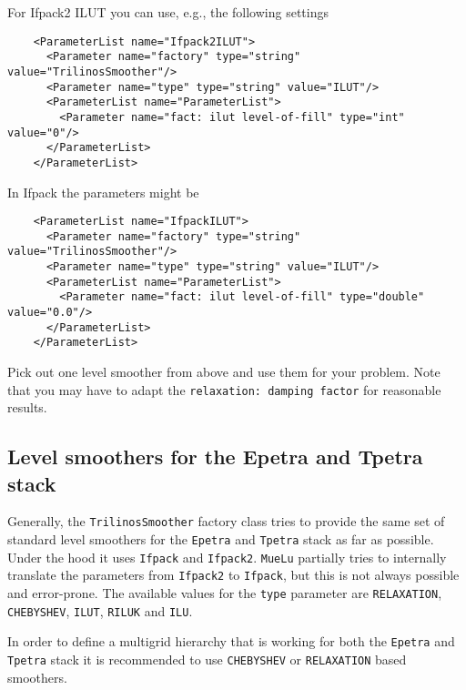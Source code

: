 \documentclass[10pt,fleqn]{book}
\begin{document}
\begin{itemize}
For Ifpack2 ILUT you can use, e.g., the following settings
\begin{lstlisting}
    <ParameterList name="Ifpack2ILUT">
      <Parameter name="factory" type="string" value="TrilinosSmoother"/>
      <Parameter name="type" type="string" value="ILUT"/>
      <ParameterList name="ParameterList">
        <Parameter name="fact: ilut level-of-fill" type="int" value="0"/>
      </ParameterList>
    </ParameterList>
\end{lstlisting}

In Ifpack the parameters might be
\begin{lstlisting}
    <ParameterList name="IfpackILUT">
      <Parameter name="factory" type="string" value="TrilinosSmoother"/>
      <Parameter name="type" type="string" value="ILUT"/>
      <ParameterList name="ParameterList">
        <Parameter name="fact: ilut level-of-fill" type="double" value="0.0"/>
      </ParameterList>
    </ParameterList>
\end{lstlisting}
\end{itemize}

\begin{exercise}
Pick out one level smoother from above and use them for your problem. Note that you may have to adapt the \texttt{relaxation: damping factor} for reasonable results.
\end{exercise}

\subsection{Level smoothers for the Epetra and Tpetra stack}

Generally, the \texttt{TrilinosSmoother} factory class tries to provide the same set of standard level smoothers for the \texttt{Epetra} and \texttt{Tpetra} stack as far as possible. Under the hood it uses \texttt{Ifpack} and \texttt{Ifpack2}.
\texttt{MueLu} partially tries to internally translate the parameters from \texttt{Ifpack2} to \texttt{Ifpack}, but this is not always possible and error-prone. The available values for the \texttt{type} parameter are \texttt{RELAXATION}, \texttt{CHEBYSHEV}, \texttt{ILUT}, \texttt{RILUK} and \texttt{ILU}.

\begin{remark}
In order to define a multigrid hierarchy that is working for both the \texttt{Epetra} and \texttt{Tpetra} stack it is recommended to use \texttt{CHEBYSHEV} or \texttt{RELAXATION} based smoothers.
\end{remark}
\end{document}
